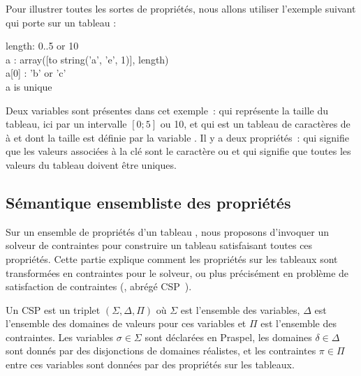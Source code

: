 \begin{example}
\label{example:data:array_proprietes}
Pour illustrer toutes les sortes de propriétés, nous allons utiliser l'exemple
suivant qui porte sur un tableau :

\begin{pre}
length: 0..5 or 10 \\
a     : array([to string('a', 'e', 1)], length) \\
a[0]  : 'b' or 'c' \\
a is unique
\end{pre}

Deux variables sont présentes dans cet exemple~:  qui représente la
taille du tableau, ici par un intervalle $[0; 5]$ ou 10, et  qui est un
tableau de caractères de  à  et dont la taille est définie par
la variable . Il y a deux propriétés~:  qui
signifie que les valeurs associées à la clé  sont le caractère
 ou  et  qui signifie que toutes les
valeurs du tableau doivent être uniques.

\end{example}

\subsection{Sémantique ensembliste des propriétés}
\label{subsection:data:solver_semantics}

Sur un ensemble de propriétés d'un tableau , nous proposons d'invoquer
un solveur de contraintes pour construire un tableau satisfaisant toutes ces
propriétés. Cette partie explique comment les propriétés sur les tableaux sont
transformées en contraintes pour le solveur, ou plus précisément en problème de
satisfaction de contraintes (, abrégé
CSP~).

\begin{definition}

Un CSP est un triplet $(\Sigma, \Delta, \Pi)$ où $\Sigma$ est l'ensemble des
variables, $\Delta$ est l'ensemble des domaines de valeurs pour ces variables et
$\Pi$ est l'ensemble des contraintes. Les variables $\sigma \in \Sigma$ sont
déclarées en Praspel, les domaines $\delta \in \Delta$ sont donnés par des
disjonctions de domaines réalistes, et les contraintes $\pi \in \Pi$ entre ces
variables sont données par des propriétés sur les tableaux.

\end{definition}

